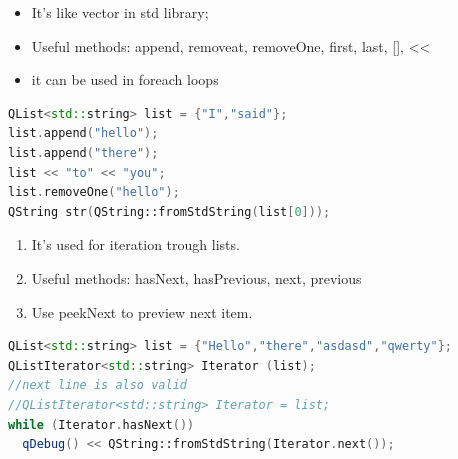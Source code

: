 \begin{note}[QList]
\begin{itemize}
\item It's like vector in std library;
\item Useful methods: append, removeat, removeOne, first, last, [], <<
\item it can be used in foreach loops
\end{itemize}
\begin{lstlisting}[language = {c++}]
QList<std::string> list = {"I","said"};
list.append("hello");
list.append("there");
list << "to" << "you";
list.removeOne("hello");
QString str(QString::fromStdString(list[0]));
\end{lstlisting}
\end{note}

\begin{note}[QListIterator]
\begin{enumerate}
	\item It's used for iteration trough lists.
	\item Useful methods: hasNext, hasPrevious, next, previous
	\item Use peekNext to preview next item.
\end{enumerate}
\begin{lstlisting}[language = {c++}]
QList<std::string> list = {"Hello","there","asdasd","qwerty"};
QListIterator<std::string> Iterator (list);
//next line is also valid
//QListIterator<std::string> Iterator = list;
while (Iterator.hasNext())
  qDebug() << QString::fromStdString(Iterator.next());
\end{lstlisting}
\end{note}

